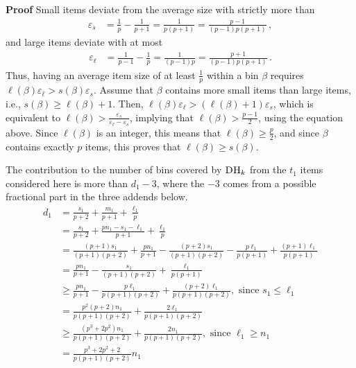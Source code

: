 \documentclass[11pt]{article}
\newenvironment{proof}{\begin{trivlist}\item[]{\bf Proof }}{\hspace*{\fill}\raisebox{-1pt}{\boldmath$\Box$}\end{trivlist}}
\newcommand{\DHk}{{\ensuremath{\textsc{DH}_k}}\xspace}
\newcommand{\p}{p}
\newcommand{\bin}{\ensuremath{\beta}}
\newcommand{\eps}{\ensuremath{\varepsilon}\xspace}
\begin{document}
\begin{proof}
Small items deviate from the average size with strictly more than
\begin{align*}
\varepsilon_s
  & = \frac{1}{\p} - \frac{1}{\p+1}
    = \frac{1}{\p(\p+1)}
    = \frac{\p-1}{(\p-1)\p(\p+1)}\,,
\end{align*}
and large items deviate with at most
\begin{align*}
\varepsilon_{\ell}
& = \frac{1}{\p-1} - \frac{1}{\p}
   = \frac{1}{(\p-1)\p}
   = \frac{\p+1}{(\p-1)\p(\p+1)}\,.
\end{align*}
Thus, having an average item size of at least $\frac{1}{\p}$ within a
  bin $\bin$ requires $\ell(\bin) \eps_{\ell} > s(\bin) \eps_s$.
Assume that $\bin$ contains more small items than large items, i.e.,
  $s(\bin) \geq \ell(\bin)+1$.
Then, $\ell(\bin) \eps_{\ell} > (\ell(\bin)+1) \eps_s$,
which is equivalent to
$\ell(\bin) > \frac{\eps_s}{\eps_{\ell}-\eps_s}$,
implying that $\ell(\bin) >   \frac{\p-1}{2}$,
using the equation above.
Since $\ell(\bin)$ is an integer, this means that $\ell(\bin) \geq
  \frac{\p}{2}$, and
since $\bin$ contains exactly $p$ items, this proves that $\ell(\bin) \geq
  s(\bin)$.


The contribution to the number of bins covered by \DHk from the $t_1$
items considered here is more than $d_1 -3$, where the $-3$ comes from
a possible fractional part in the three addends below.
\begin{align*}
d_1
 & = \frac{s_1}{\p+2} + \frac{m_1}{\p+1} + \frac{\ell_1}{\p}\\
 & = \frac{s_1}{\p+2} + \frac{\p n_1 - s_1 - \ell_1}{\p+1} + \frac{\ell_1}{\p}\\
 & = \frac{(\p+1)s_1}{(\p+1)(p+2)} + \frac{\p n_1}{\p+1} -
     \frac{(\p+2)s_1}{(\p+1)(\p+2)} - \frac{\p \ell_1}{\p(\p+1)} +
     \frac{(p+1)\ell_1}{\p(\p+1)} \\ 
 & = \frac{\p n_1}{\p+1} - \frac{s_1}{(\p+1)(\p+2)} + \frac{\ell_1}{\p(\p+1)} \\
 & \geq \frac{\p n_1 }{\p+1} - \frac{\p \ell_1}{\p(\p+1)(\p+2)}
      + \frac{(\p+2)\ell_1}{\p(\p+1)(\p+2)}, \text{ since } s_1 \leq \ell_1 \\
 & = \frac{\p^2 (\p+2) n_1 }{\p(\p+1)(\p+2)} +
     \frac{2\ell_1}{\p(\p+1)(\p+2)}\\
 & \geq  \frac{(\p^3+2\p^2)n_1}{\p(\p+1)(\p+2)} +
     \frac{2n_1}{\p(\p+1)(\p+2)}, \text{ since } \ell_1 \geq n_1\\
 & =  \frac{\p^3+2\p^2+2}{\p(\p+1)(\p+2)} n_1
\end{align*}


\end{proof}
\end{document}
